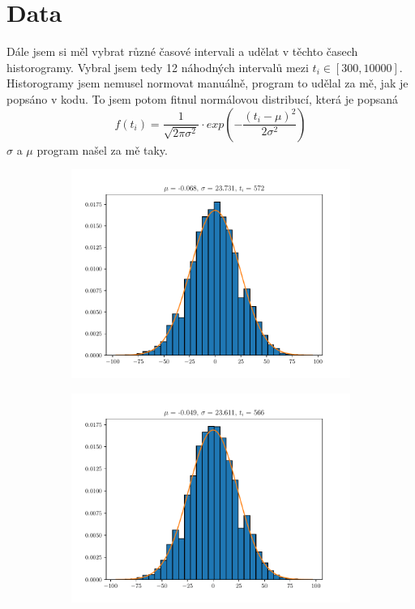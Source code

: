 \documentclass{article}
\begin{document}
\newpage
\section{Data}
Dále jsem si měl vybrat různé časové intervali a udělat v těchto časech historogramy.
Vybral jsem tedy 12 náhodných intervalů mezi $t_{i} \in [300, 10000]$.\\
Historogramy jsem nemusel normovat manuálně, program to udělal za mě, jak je popsáno v kodu.
To jsem potom fitnul normálovou distribucí, která je popsaná
$$f(t_{i}) = \frac{1}{\sqrt{2 \pi \sigma^{2}}} \cdot exp\left(-\frac{(t_{i} - \mu)^{2}}{2\sigma^{2}}\right)$$
$\sigma$ a $\mu$ program našel za mě taky.

\begin{figure}
\begin{subfigure}{.3\textwidth}
  \centering
  \includegraphics[width=1.1\linewidth]{hist1.pdf}
\end{subfigure}
\begin{subfigure}{.3\textwidth}
  \centering
  \includegraphics[width=1.1\linewidth]{hist2.pdf}

\end{subfigure}
\end{figure}
\end{document}
